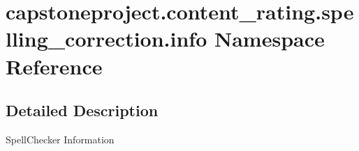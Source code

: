 \hypertarget{namespacecapstoneproject_1_1content__rating_1_1spelling__correction_1_1info}{}\section{capstoneproject.\+content\+\_\+rating.\+spelling\+\_\+correction.\+info Namespace Reference}
\label{namespacecapstoneproject_1_1content__rating_1_1spelling__correction_1_1info}


\subsection{Detailed Description}
\begin{DoxyVerb}SpellChecker Information \end{DoxyVerb}
 